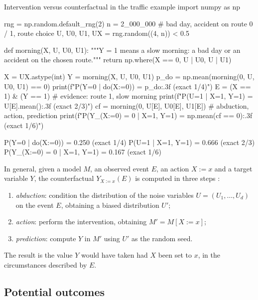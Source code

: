 \begin{pylisting}[label={lst:traffic}]{Intervention versus counterfactual in the traffic example}
import numpy as np

rng = np.random.default_rng(2)
n = 2_000_000
# bad day, accident on route 0 / 1, route choice
U, U0, U1, UX = rng.random((4, n)) < 0.5

def morning(X, U, U0, U1):
    """Y = 1 means a slow morning: a bad day or an accident on the chosen route."""
    return np.where(X == 0, U | U0, U | U1)

X = UX.astype(int)
Y = morning(X, U, U0, U1)
p_do = np.mean(morning(0, U, U0, U1) == 0)
print(f"P(Y=0 | do(X:=0))          = {p_do:.3f}  (exact 1/4)")
E = (X == 1) & (Y == 1)                                  # evidence: route 1, slow morning
print(f"P(U=1 | X=1, Y=1)          = {U[E].mean():.3f}  (exact 2/3)")
cf = morning(0, U[E], U0[E], U1[E])                      # abduction, action, prediction
print(f"P(Y_(X:=0) = 0 | X=1, Y=1) = {np.mean(cf == 0):.3f}  (exact 1/6)")
\end{pylisting}
\begin{pyoutput}
P(Y=0 | do(X:=0))          = 0.250  (exact 1/4)
P(U=1 | X=1, Y=1)          = 0.666  (exact 2/3)
P(Y_(X:=0) = 0 | X=1, Y=1) = 0.167  (exact 1/6)
\end{pyoutput}

In general, given a model $M$, an observed event $E$, an action $X:=x$ and a target variable $Y$,
the counterfactual $Y_{X:=x}(E)$ is computed in three steps \citep{pearl2009causality}:
\begin{enumerate}
  \item \emph{abduction}: condition the distribution of the noise variables $U=(U_1,\dots,U_d)$ on
        the event $E$, obtaining a biased distribution $U'$;
  \item \emph{action}: perform the intervention, obtaining $M'=M[X:=x]$;
  \item \emph{prediction}: compute $Y$ in $M'$ using $U'$ as the random seed.
\end{enumerate}
The result is the value $Y$ would have taken had $X$ been set to $x$, in the circumstances
described by $E$.

\subsection{Potential outcomes}\label{sec:potentialoutcomes}

